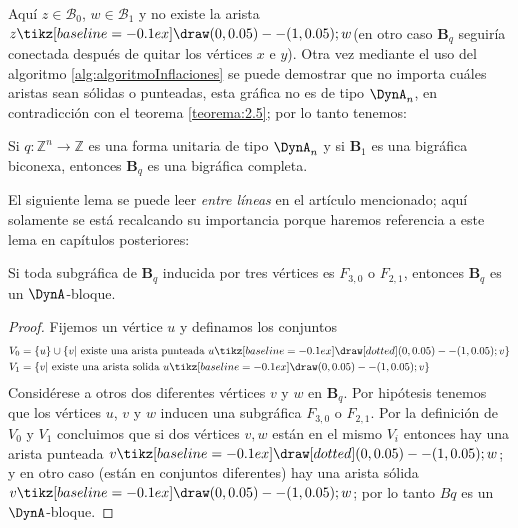 \begin{figure}[h]
   \centering%
\end{figure}
Aquí $z \in \mathcal{B}_{0}$, $w \in \mathcal{B}_{1}$ y no existe la arista $z \tikz[baseline=-0.1ex]\draw (0,0.05) -- (1,0.05); w$(en otro caso $\textbf{B}_{q}$ seguiría conectada después de quitar los vértices $x$ e $y$). Otra vez mediante el uso del algoritmo \ref{alg:algoritmoInflaciones} se puede demostrar que no importa cuáles aristas sean sólidas o punteadas, esta gráfica no es de tipo $\DynA_{n}$, en contradicción con el teorema \ref{teorema:2.5}; por lo tanto tenemos:\\
\begin{lemma}
Si $q:\mathbb{Z}^{n} \rightarrow \mathbb{Z}$ es una forma unitaria de tipo $\DynA_{n}$ y si $\textbf{B}_{1}$ es una bigráfica biconexa, entonces $\textbf{B}_{q}$ es una bigráfica completa.
\label{lema:2.7}
\end{lemma}
El siguiente lema se puede leer \textit{entre líneas} en el artículo mencionado; aquí solamente se está recalcando su importancia porque haremos referencia a este lema en capítulos posteriores:
\begin{lemma}
Si toda subgráfica de $\textbf{B}_{q}$ inducida por tres vértices es $F_{3,0}$ o $F_{2,1}$, entonces $\textbf{B}_{q}$ es un $\DynA$-bloque.
\label{lema:2.8}
\end{lemma}
\begin{proof}
Fijemos un vértice $u$ y definamos los conjuntos
\begin{equation*}
\begin{split}
V_{0} & = \{u\} \cup \{v |  \mbox{  existe una arista punteada } u \tikz[baseline=-0.1ex]\draw[dotted] (0,0.05) -- (1,0.05); v\}\\
V_{1} & = \{v |  \mbox{ existe una arista solida } u \tikz[baseline=-0.1ex]\draw (0,0.05) -- (1,0.05); v\}
\end{split}
\end{equation*}
Considérese a otros dos diferentes vértices $v$ y $w$ en $\textbf{B}_{q}$. Por hipótesis tenemos que los vértices $u$, $v$ y $w$ inducen una subgráfica $F_{3,0}$ o $F_{2,1}$. Por la definición de $V_{0}$ y $V_{1}$ concluimos que si dos vértices $v, w$ están en el mismo $V_{i}$ entonces hay una arista punteada $v \tikz[baseline=-0.1ex]\draw[dotted](0,0.05) -- (1,0.05); w$; y en otro caso (están en conjuntos diferentes) hay una arista sólida $v \tikz[baseline=-0.1ex]\draw(0,0.05) -- (1,0.05); w$; por lo tanto $Bq$ es un $\DynA$-bloque.
\end{proof}
